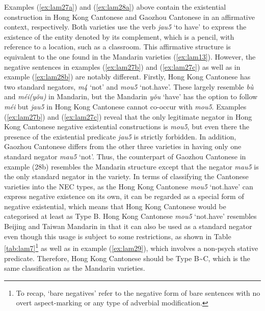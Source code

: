 \documentclass[output=paper]{langscibook}
\begin{document}
Examples (\ref{ex:lam27a}) and (\ref{ex:lam28a}) above contain the existential construction in Hong Kong Cantonese and Gaozhou Cantonese in an affirmative context, respectively. Both varieties use the verb \textit{jau5} `to have' to express the existence of the entity denoted by its complement, which is a pencil, with reference to a location, such as a classroom. This affirmative structure is equivalent to the one found in the Mandarin varieties (\ref{ex:lam13}). However, the negative sentences in examples (\ref{ex:lam27b}) and (\ref{ex:lam27c}) as well as in example (\ref{ex:lam28b}) are notably different. Firstly, Hong Kong Cantonese has two standard negators, \textit{m4} `not' and \textit{mou5} `not.have'. These largely resemble \textit{bù} and \textit{méi(yǒu)} in Mandarin, but the Mandarin \textit{yǒu} `have' has the option to follow \textit{méi} but \textit{jau5} in Hong Kong Cantonese cannot co-occur with \textit{mou5}. Examples (\ref{ex:lam27b}) and (\ref{ex:lam27c}) reveal that the only legitimate negator in Hong Kong Cantonese negative existential constructions is \textit{mou5}, but even there the presence of the existential predicate \textit{jau5} is strictly forbidden. In addition, Gaozhou Cantonese differs from the other three varieties in having only one standard negator \textit{mau5} `not'. Thus, the counterpart of Gaozhou Cantonese in example (28b) resembles the Mandarin structure except that the negator \textit{mau5} is the only standard negator in the variety. In terms of classifying the Cantonese varieties into the NEC types, as the Hong Kong Cantonese \textit{mou5} `not.have' can express negative existence on its own, it can be regarded as a special form of negative existential, which means that Hong Kong Cantonese would be categorised at least as Type B. Hong Kong Cantonese \textit{mou5} `not.have' resembles Beijing and Taiwan Mandarin in that it can also be used as a standard negator even though this usage is subject to some restrictions, as shown in Table \ref{tab:lam7}\footnote{To recap, `bare negatives' refer to the negative form of bare sentences with no overt aspect-marking or any type of adverbial modification.} as well as in example (\ref{ex:lam29}), which involves a non-psych stative predicate. Therefore, Hong Kong Cantonese should be Type B\sim C, which is the same classification as the Mandarin varieties. 
\end{document}

